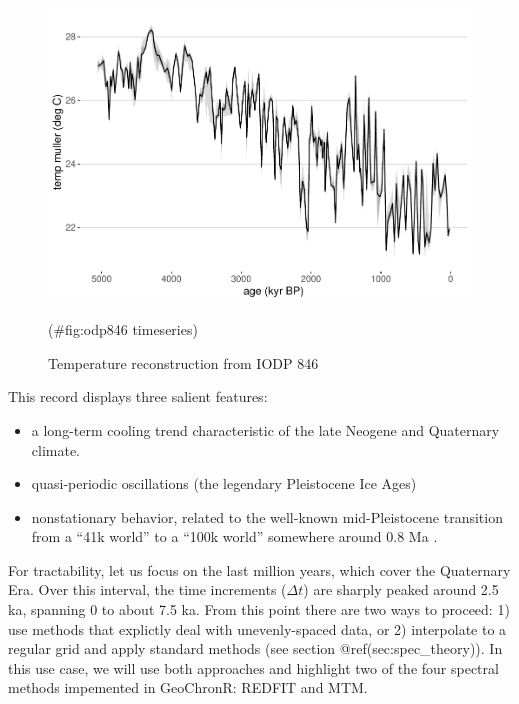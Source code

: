 \documentclass[gchron, manuscript]{copernicus}
\begin{document}
\begin{figure}
\includegraphics[width=12cm]{geoChronR-paper_files/figure-latex/odp846 timeseries-1} \caption{Temperature reconstruction from IODP 846}(\#fig:odp846 timeseries)
\end{figure}

This record displays three salient features:

\begin{itemize}
\item
  a long-term cooling trend characteristic of the late Neogene and Quaternary climate.
\item
  quasi-periodic oscillations (the legendary Pleistocene Ice Ages)
\item
  nonstationary behavior, related to the well-known mid-Pleistocene transition from a ``41k world'' to a ``100k world'' somewhere around 0.8 Ma \citep{Paillard_2001}.
\end{itemize}

For tractability, let us focus on the last million years, which cover the Quaternary Era.
Over this interval, the time increments (\(\Delta t\)) are sharply peaked around 2.5 ka, spanning 0 to about 7.5 ka.
From this point there are two ways to proceed: 1) use methods that explictly deal with unevenly-spaced data, or 2) interpolate to a regular grid and apply standard methods (see section @ref(sec:spec\_theory)).
In this use case, we will use both approaches and highlight two of the four spectral methods impemented in GeoChronR: REDFIT and MTM.
\end{document}
